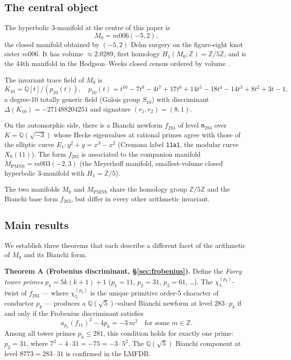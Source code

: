 \subsection{The central object}

The hyperbolic 3-manifold at the centre of this paper is
\[
  M_0 = m006(-5,2),
\]
the closed manifold obtained by $(-5,2)$ Dehn surgery on the figure-eight
knot sister $m006$. It has volume $\approx 2.0289$, first homology
$H_1(M_0; \mathbb{Z}) = \mathbb{Z}/5\mathbb{Z}$, and is the 44th
manifold in the Hodgson--Weeks closed census ordered by volume \cite{snappy}.

The invariant trace field of $M_0$ is
\[
  K_{10} = \mathbb{Q}[t]/(p_{10}(t)),
  \quad
  p_{10}(t) = t^{10} - 7t^8 - 4t^7 + 17t^6 + 14t^5 - 18t^4 - 14t^3 + 8t^2 + 3t - 1,
\]
a degree-10 totally generic field (Galois group $S_{10}$) with discriminant
$\Delta(K_{10}) = -271488204251$ and signature $(r_1, r_2) = (8, 1)$.

On the automorphic side, there is a Bianchi newform $f_{283}$ of level
$\mathfrak{n}_{283}$ over $K = \mathbb{Q}(\sqrt{-3})$ whose Hecke
eigenvalues at rational primes agree with those of the elliptic curve
$E_1\colon y^2 + y = x^3 - x^2$ (Cremona label \texttt{11a1},
the modular curve $X_0(11)$). The form $f_{283}$ is associated to the
companion manifold
$M_{\mathrm{PMNS}} = m003(-2,3)$ (the Meyerhoff manifold, smallest-volume
closed hyperbolic 3-manifold with $H_1 = \mathbb{Z}/5$).

The two manifolds $M_0$ and $M_{\mathrm{PMNS}}$ share the homology group
$\mathbb{Z}/5\mathbb{Z}$ and the Bianchi base form $f_{283}$, but differ
in every other arithmetic invariant.

\subsection{Main results}

We establish three theorems that each describe a different facet of the
arithmetic of $M_0$ and its Bianchi form.

\medskip
\textbf{Theorem A (Frobenius discriminant, \S\ref{sec:frobenius}).}
Define the \emph{Farey tower primes} $p_k = 5k(k+1)+1$ ($p_1 = 11$,
$p_2 = 31$, $p_3 = 61$, \ldots). The $\chi_5^{(p_k)}$-twist of $f_{283}$
— where $\chi_5^{(p_k)}$ is the unique primitive order-5 character of
conductor $p_k$ — produces a $\mathbb{Q}(\sqrt{5})$-valued Bianchi newform
at level $283\cdot p_k$ if and only if the Frobenius discriminant satisfies
\[
  a_{p_k}(f_{11})^2 - 4p_k = -3\,m^2 \quad\text{for some }m \in \mathbb{Z}.
\]
Among all tower primes $p_k \leq 281$, this condition holds for exactly
one prime: $p_2 = 31$, where $7^2 - 4\cdot 31 = -75 = -3\cdot 5^2$.
The $\mathbb{Q}(\sqrt{5})$ Bianchi component at level $8773 = 283\cdot 31$
is confirmed in the LMFDB.


